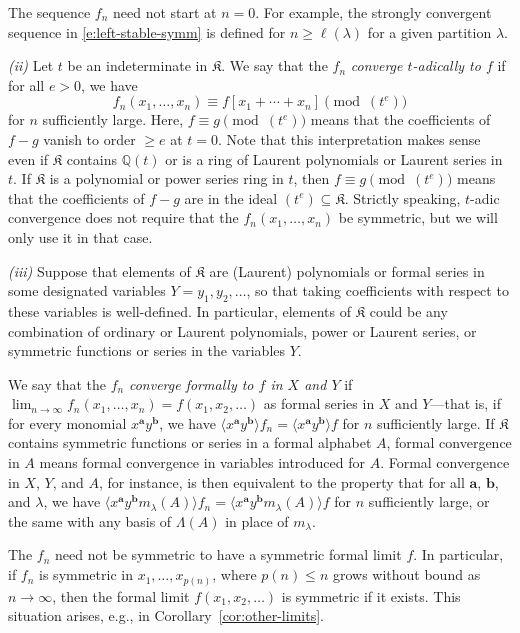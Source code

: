 \documentclass[12pt]{amsart}
\theoremstyle{definition}
\theoremstyle{remark}
\newcommand{\QQ}{{\mathbb Q}}
\newcommand{\aA}{{\mathbf a}}
\newcommand{\bb}{{\mathbf b}}
\newcommand{\Kfrak}{{\mathfrak K}}
\begin{document}
The sequence $f_{n}$ need not start at $n=0$.  For example, the
strongly convergent sequence in \eqref{e:left-stable-symm} is defined
for $n\geq \ell (\lambda )$ for a given partition $\lambda $.

{\it (ii) } Let $t$ be an indeterminate in $\Kfrak $.  We say that the
$f_{n}$ {\em converge $t$-adically to $f$} if for all $e>0$, we have
\begin{equation}\label{e:t-adic-convergence}
f_{n}(x_{1},\ldots,x_{n}) \equiv  f[x_{1}+\cdots +x_{n}] \pmod{(t^{e})}
\end{equation}
for $n$ sufficiently large.  Here, $f\equiv g \pmod{(t^{e})}$ means
that the coefficients of $f-g$ vanish to order $\geq e$ at $t = 0$.
Note that this interpretation makes sense even if $\Kfrak $ contains
$\QQ (t)$ or is a ring of Laurent polynomials or Laurent series in
$t$.  If $\Kfrak $ is a polynomial or power series ring in $t$, then
$f\equiv g \pmod{(t^{e})}$ means that the coefficients of $f-g$ are in
the ideal $(t^{e})\subseteq \Kfrak $.  Strictly speaking, $t$-adic
convergence does not require that the $f_{n}(x_{1},\ldots,x_{n})$ be
symmetric, but we will only use it in that case.

{\it (iii) } Suppose that elements of $\Kfrak $ are (Laurent)
polynomials or formal series in some designated variables $Y = y_{1},
y_{2}, \ldots $, so that taking coefficients with respect to these
variables is well-defined.  In particular, elements of $\Kfrak $ could
be any combination of ordinary or Laurent polynomials, power or
Laurent series, or symmetric functions or series in the variables $Y$.

We say that the $f_{n}$ {\em converge formally to $f$ in $X$ and $Y$}
if $\lim_{n\rightarrow \infty } f_{n}(x_{1},\ldots,x_{n}) = f(x_{1},
x_{2}, \ldots )$ as formal series in $X$ and $Y$---that is, if for
every monomial $x^{\aA } y^{\bb }$, we have $\langle x^{\aA } y^{\bb }
\rangle f_{n} = \langle x^{\aA } y^{\bb } \rangle f$ for $n$
sufficiently large.  If $\Kfrak $ contains symmetric functions or
series in a formal alphabet $A$, formal convergence in $A$ means
formal convergence in variables introduced for $A$.  Formal
convergence in $X$, $Y$, and $A$, for instance, is then equivalent to
the property that for all $\aA $, $\bb $, and $\lambda $, we have
$\langle x^{\aA } y^{\bb } m_{\lambda }(A) \rangle f_{n} = \langle
x^{\aA } y^{\bb } m_{\lambda }(A) \rangle f$ for $n$ sufficiently
large, or the same with any basis of $\Lambda (A)$ in place of
$m_{\lambda }$.

The $f_{n}$ need not be symmetric to have a symmetric formal limit
$f$.  In particular, if $f_{n}$ is symmetric in
$x_{1},\ldots,x_{p(n)}$, where $p(n)\leq n$ grows without bound as
$n\rightarrow \infty $, then the formal limit $f(x_{1}, x_{2}, \ldots
)$ is symmetric if it exists.  This situation arises, e.g., in
Corollary~\ref{cor:other-limits}.
\end{document}
